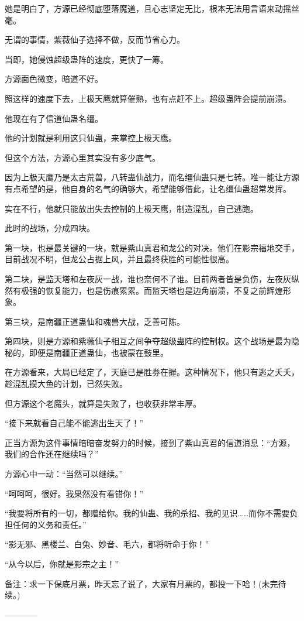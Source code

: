 \begin{this_body}
她是明白了，方源已经彻底堕落魔道，且心志坚定无比，根本无法用言语来动摇丝毫。

无谓的事情，紫薇仙子选择不做，反而节省心力。

当即，她侵蚀超级蛊阵的速度，更快了一筹。

方源面色微变，暗道不好。

照这样的速度下去，上极天鹰就算催熟，也有点赶不上。超级蛊阵会提前崩溃。

他现在有了信道仙蛊名缰。

他的计划就是利用这只仙蛊，来掌控上极天鹰。

但这个方法，方源心里其实没有多少底气。

因为上极天鹰乃是太古荒兽，八转蛊仙战力，而名缰仙蛊只是七转。唯一能让方源有点希望的是，他自身的名气的确够大，希望能够借此，让名缰仙蛊超常发挥。

实在不行，他就只能放出失去控制的上极天鹰，制造混乱，自己逃跑。

此时的战场，分成四块。

第一块，也是最关键的一块，就是紫山真君和龙公的对决。他们在影宗福地交手，目前战况不明，但龙公占据上风，并且最终获胜的可能性很高。

第二块，是监天塔和左夜灰一战，谁也奈何不了谁。目前两者皆是负伤，左夜灰纵然有极强的恢复能力，也是伤痕累累。而监天塔也是边角崩溃，不复之前辉煌形象。

第三块，是南疆正道蛊仙和魂兽大战，乏善可陈。

第四块，则是方源和紫薇仙子相互之间争夺超级蛊阵的控制权。这个战场是最为隐秘的，即便是南疆正道蛊仙，也被蒙在鼓里。

在方源看来，大局已经定了，天庭已是胜券在握。这种情况下，他只有逃之夭夭，趁混乱摸大鱼的计划，已然失败。

但方源这个老魔头，就算是失败了，也收获非常丰厚。

“接下来就看自己能不能逃出生天了！”

正当方源为这件事情暗暗奋发努力的时候，接到了紫山真君的信道消息：“方源，我们的合作还在继续吗？”

方源心中一动：“当然可以继续。”

“呵呵呵，很好。我果然没有看错你！”

“我要将所有的一切，都赠给你。我的仙蛊、我的杀招、我的见识……而你不需要负担任何的义务和责任。”

“影无邪、黑楼兰、白兔、妙音、毛六，都将听命于你！”

“从今以后，你就是影宗之主！”

备注：求一下保底月票，昨天忘了说了，大家有月票的，都投一下哈！(未完待续。)

------------

\end{this_body}

